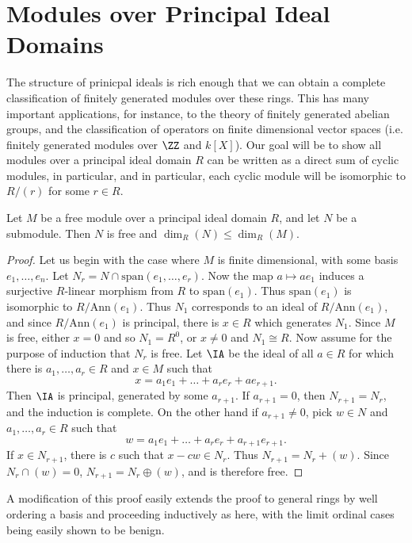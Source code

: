 \section{Modules over Principal Ideal Domains}

The structure of prinicpal ideals is rich enough that we can obtain a complete classification of finitely generated modules over these rings. This has many important applications, for instance, to the theory of finitely generated abelian groups, and the classification of operators on finite dimensional vector spaces (i.e. finitely generated modules over $\ZZ$ and $k[X]$). Our goal will be to show all modules over a principal ideal domain $R$ can be written as a direct sum of cyclic modules, in particular, and in particular, each cyclic module will be isomorphic to $R/(r)$ for some $r \in R$.

\begin{lemma}
    Let $M$ be a free module over a principal ideal domain $R$, and let $N$ be a submodule. Then $N$ is free and $\dim_R(N) \leq \dim_R(M)$.
\end{lemma}
\begin{proof}
    Let us begin with the case where $M$ is finite dimensional, with some basis $e_1,\dots,e_n$. Let $N_r = N \cap \text{span}(e_1,\dots,e_r)$. Now the map $a \mapsto ae_1$ induces a surjective $R$-linear morphism from $R$ to $\text{span}(e_1)$. Thus $\text{span}(e_1)$ is isomorphic to $R/\text{Ann}(e_1)$. Thus $N_1$ corresponds to an ideal of $R/\text{Ann}(e_1)$, and since $R/\text{Ann}(e_1)$ is principal, there is $x \in R$ which generates $N_1$. Since $M$ is free, either $x = 0$ and so $N_1 = R^0$, or $x \neq 0$ and $N_1 \cong R$. Now assume for the purpose of induction that $N_r$ is free. Let $\IA$ be the ideal of all $a \in R$ for which there is $a_1,\dots,a_r \in R$ and $x \in M$ such that
    \[ x = a_1e_1 + \dots + a_re_r + ae_{r+1}. \]
    Then $\IA$ is principal, generated by some $a_{r+1}$. If $a_{r+1} = 0$, then $N_{r+1} = N_r$, and the induction is complete. On the other hand if $a_{r+1} \neq 0$, pick $w \in N$ and $a_1,\dots,a_r \in R$ such that
    \[ w = a_1e_1 + \dots + a_re_r + a_{r+1}e_{r+1}. \]
    If $x \in N_{r+1}$, there is $c$ such that $x - cw \in N_r$. Thus $N_{r+1} = N_r + (w)$. Since $N_r \cap (w) = 0$, $N_{r+1} = N_r \oplus (w)$, and is therefore free.
\end{proof}

\begin{remark}
    A modification of this proof easily extends the proof to general rings by well ordering a basis and proceeding inductively as here, with the limit ordinal cases being easily shown to be benign.
\end{remark}

